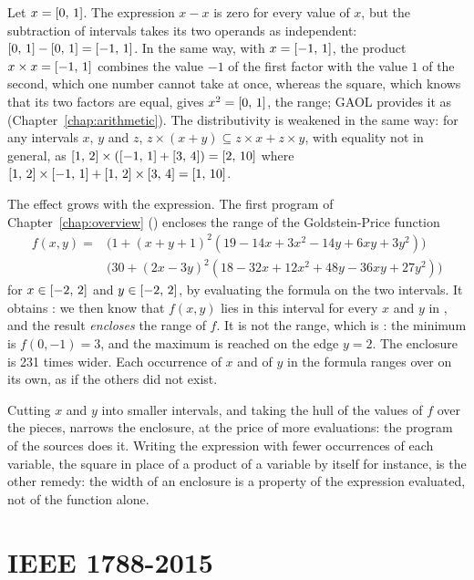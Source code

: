 \documentclass[12pt,a4paper,twoside,openright]{book}
\begin{document}
\begin{Ex}\label{ex:dependency}
Let $x=[0,\,1]$. The expression $x-x$ is zero for every value of $x$,
but the subtraction of intervals takes its two operands as independent:
$[0,\,1]-[0,\,1]=[-1,\,1]$. In the same way, with $x=[-1,\,1]$,
the product $x\times x=[-1,\,1]$ combines the value $-1$ of the first
factor with the value $1$ of the second, which one number cannot take at
once, whereas the square, which knows that its two factors are equal, gives
$x^2=[0,\,1]$, the range; GAOL provides it as 
(Chapter~\ref{chap:arithmetic}). The distributivity is weakened in the same
way: for any intervals $x$, $y$ and $z$,
$z\times(x+y)\subseteq z\times x+z\times y$, with equality not in general,
as $[1,\,2]\times([-1,\,1]+[3,\,4])=[2,\,10]$ where
$[1,\,2]\times[-1,\,1]+[1,\,2]\times[3,\,4]=[1,\,10]$.
\end{Ex}

The effect grows with the expression. The first program of
Chapter~\ref{chap:overview} () encloses the range
of the Goldstein-Price function
\begin{align*}
f(x,y)=&\bigl(1+(x+y+1)^2(19-14x+3x^2-14y+6xy+3y^2)\bigr)\\
&\bigl(30+(2x-3y)^2(18-32x+12x^2+48y-36xy+27y^2)\bigr)
\end{align*}
for $x\in[-2,\,2]$ and $y\in[-2,\,2]$, by evaluating the formula on
the two intervals. It obtains : we then know that
$f(x,y)$ lies in this interval for every $x$ and $y$ in , and
the result \emph{encloses} the range of $f$. It is not the range, which is
: the minimum is $f(0,-1)=3$, and the maximum is
reached on the edge $y=2$. The enclosure is 231 times wider. Each
occurrence of $x$ and of $y$ in the formula ranges over  on its
own, as if the others did not exist.
%

\medskip
Cutting $x$ and $y$ into smaller intervals, and taking the hull of the
values of $f$ over the pieces, narrows the enclosure, at the price of more
evaluations: the program  of the
sources does it. Writing the expression with fewer occurrences of each
variable, the square in place of a product of a variable by itself for
instance, is the other remedy: the width of an enclosure is a property of
the expression evaluated, not of the function alone.

\section{IEEE 1788-2015}\label{sec:ieee1788-overview}
%
\end{document}
